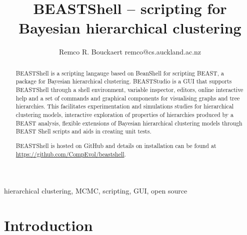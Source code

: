 \documentclass[twoside,11pt]{article}
\begin{document}
\title{BEASTShell -- scripting for Bayesian hierarchical clustering}
\author{\name Remco R. Bouckaert \email remco@cs.auckland.ac.nz}
\editor{---}
\maketitle

\begin{abstract}
BEASTShell is a scripting langauge based on BeanShell for scripting BEAST, a package for Bayesian hierarchical clustering. BEASTStudio is a GUI that supports BEASTShell through a shell environment, variable inspector, editors, 
online interactive help and a set of commands and graphical components for visualising graphs and tree hierarchies.
This facilitates experimentation and simulations studies for hierarchical clustering models, interactive exploration of properties of hierarchies produced by a BEAST analysis, flexible extensions of Bayesian hierarchical clustering models 
through BEAST Shell scripts and aids in creating unit tests.

BEASTShell is hosted on GitHub and details on installation can be found at
\url{https://github.com/CompEvol/beastshell}.
\end{abstract}
\begin{keywords}
  hierarchical clustering, MCMC, scripting, GUI, open source
\end{keywords}

\section{Introduction}
\end{document}
